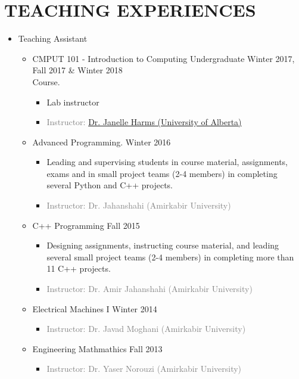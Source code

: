\section{TEACHING EXPERIENCES}
\begin{itemize}
	\item Teaching Assistant
	\begin{itemize}
	
		\item {} CMPUT 101 - Introduction to Computing Undergraduate  \hfill Winter 2017, Fall 2017 \& Winter 2018
		\\ Course.
		\begin{itemize} 
			\item Lab instructor
			
			\item\textcolor{gray}{Instructor: \href{https://webdocs.cs.ualberta.ca/~harms/}{Dr. Janelle Harms (University of Alberta)}}
		\end{itemize}
			
		\item {} Advanced Programming. \hfill Winter 2016
		\begin{itemize} 
			\item Leading and supervising students in course material, assignments, exams and in small project teams (2-4 members) in completing several Python and C++ projects.
			\item\textcolor{gray}{Instructor: Dr. Jahanshahi (Amirkabir University)}
		\end{itemize}
		
		\item {} C++ Programming \hfill Fall 2015
		\begin{itemize} 
			\item Designing assignments, instructing course material, and leading several small project teams (2-4 members) in completing more than 11 C++ projects.
			\item \textcolor{gray}{Instructor: Dr. Amir Jahanshahi (Amirkabir University)}
		\end{itemize}
		
		\item {} Electrical Machines I \hfill Winter 2014
		\begin{itemize} 
			\item \textcolor{gray}{Instructor: Dr. Javad Moghani (Amirkabir University)}
		\end{itemize}
		
		\item {} Engineering Mathmathics \hfill Fall 2013
		\begin{itemize} 
			\item\textcolor{gray}{Instructor: Dr. Yaser Norouzi (Amirkabir University)} 
		\end{itemize}
	
	\end{itemize}
\end{itemize}

